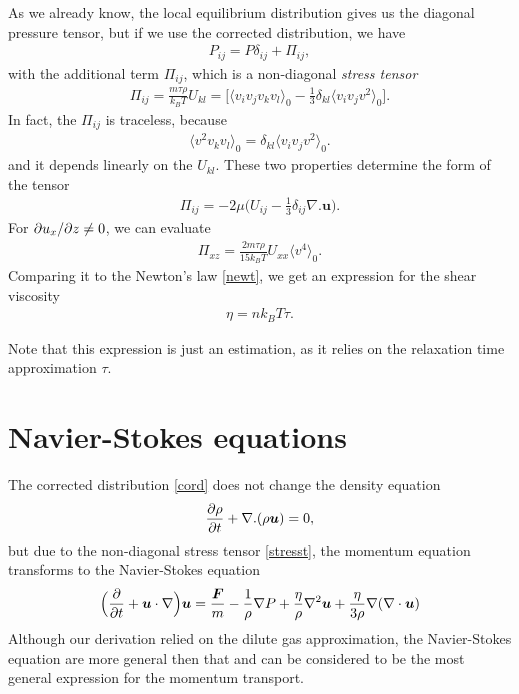As we already know, the local equilibrium distribution gives us the diagonal pressure tensor, but if we use the corrected distribution, we have
\begin{align}
P_{ij} = P \delta_{ij} + \Pi_{ij},
\end{align}
with the additional term $\Pi_{ij}$, which is a non-diagonal \textit{stress tensor}
\begin{align*}
\Pi_{ij} = \frac{m \tau \rho}{k_B T} U_{kl} = \Big[ \langle v_i v_j v_k v_l \rangle_0 - \frac{1}{3} \delta_{kl} \langle v_i v_j v^2 \rangle_0 \Big].
\end{align*}
In fact, the $\Pi_{ij}$ is traceless, because
\begin{align*}
\langle v^2 v_k v_l \rangle_0 = \delta_{kl} \langle v_i v_j v^2 \rangle_0. 
\end{align*}
and it depends linearly on the $U_{kl}$.
These two properties determine the form of the tensor
\begin{align} \label{stresst}
\Pi_{ij} = -2 \mu \big( U_{ij} - \frac{1}{3} \delta_{ij} \nabla . \bm{u} \big).
\end{align}
For $\partial u_x / \partial z \neq 0$, we can evaluate
\begin{align*}
\Pi_{xz} = \frac{2m\tau \rho}{15k_B T} U_{xx} \langle v^4 \rangle_0.
\end{align*}
Comparing it to the Newton's law \ref{newt}, we get an expression for the shear viscosity
\begin{align} \label{shearv}
\eta = n k_B T \tau.
\end{align}

Note that this expression is just an estimation, as it relies on the relaxation time approximation $\tau$.

\section{Navier-Stokes equations}

The corrected distribution \ref{cord} does not change the density equation
\begin{align*}
\frac{\partial \rho}{\partial t} + \nabla . (\rho \bm{u}) = 0,
\end{align*}
but due to the non-diagonal stress tensor \ref{stresst}, the momentum equation transforms to the Navier-Stokes equation
\begin{align}
\Big(\frac{\partial}{\partial t} + \bm{u} \cdot \nabla \Big) \bm{u} = \frac{\bm{F}}{m} - \frac{1}{\rho} \nabla P + \frac{\eta}{\rho} \nabla^2 \bm{u} + \frac{\eta}{3 \rho}\nabla(\nabla \cdot \bm{u})
\end{align}
Although our derivation relied on the dilute gas approximation, the Navier-Stokes equation are more general then that and can be considered to be the most general expression for the momentum transport.

